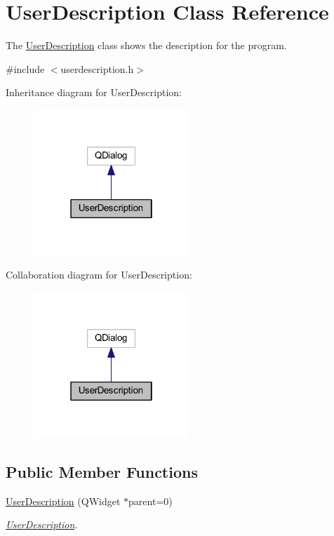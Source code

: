\hypertarget{class_user_description}{}\section{User\+Description Class Reference}
\label{class_user_description}


The \hyperlink{class_user_description}{User\+Description} class shows the description for the program.  




{\ttfamily \#include $<$userdescription.\+h$>$}



Inheritance diagram for User\+Description\+:
\nopagebreak
\begin{figure}[H]
\begin{center}
\leavevmode
\includegraphics[width=166pt]{class_user_description__inherit__graph}
\end{center}
\end{figure}


Collaboration diagram for User\+Description\+:
\nopagebreak
\begin{figure}[H]
\begin{center}
\leavevmode
\includegraphics[width=166pt]{class_user_description__coll__graph}
\end{center}
\end{figure}
\subsection*{Public Member Functions}
\begin{DoxyCompactItemize}
\item 
\hyperlink{class_user_description_a07117ea9e660fd6ae0a7ecc569edf0f6}{User\+Description} (Q\+Widget $\ast$parent=0)
\begin{DoxyCompactList}\small\item\em \hyperlink{class_user_description}{User\+Description}. \end{DoxyCompactList}\end{DoxyCompactItemize}


